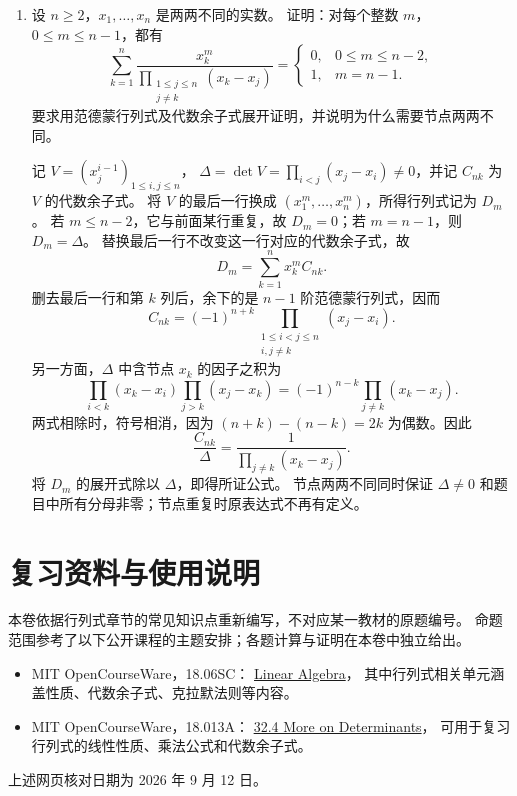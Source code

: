 \documentclass[UTF8,12pt,a4paper,fontset=fandol]{ctexart}
\begin{document}
\begin{enumerate}[label=\arabic*.,resume=detquestions]
\item\label{q:interpolation-sum}
设 $n\geq2$，$x_1,\ldots,x_n$ 是两两不同的实数。
证明：对每个整数 $m$，$0\leq m\leq n-1$，都有
\[
\sum_{k=1}^n
\frac{x_k^m}{\displaystyle\prod_{\substack{1\leq j\leq n\\j\ne k}}(x_k-x_j)}
=\begin{cases}0,&0\leq m\leq n-2,\\1,&m=n-1.\end{cases}
\]
要求用范德蒙行列式及代数余子式展开证明，并说明为什么需要节点两两不同。
\begin{solve}
记 $V=(x_j^{i-1})_{1\leq i,j\leq n}$，
$\Delta=\det V=\prod_{i<j}(x_j-x_i)\ne0$，并记 $C_{nk}$ 为 $V$ 的代数余子式。
将 $V$ 的最后一行换成 $(x_1^m,\ldots,x_n^m)$，所得行列式记为 $D_m$。
若 $m\leq n-2$，它与前面某行重复，故 $D_m=0$；若 $m=n-1$，则 $D_m=\Delta$。
替换最后一行不改变这一行对应的代数余子式，故
\[
D_m=\sum_{k=1}^n x_k^m C_{nk}.
\]
删去最后一行和第 $k$ 列后，余下的是 $n-1$ 阶范德蒙行列式，因而
\[
C_{nk}=(-1)^{n+k}
\prod_{\substack{1\leq i<j\leq n\\i,j\ne k}}(x_j-x_i).
\]
另一方面，$\Delta$ 中含节点 $x_k$ 的因子之积为
\[
\prod_{i<k}(x_k-x_i)\prod_{j>k}(x_j-x_k)
=(-1)^{n-k}\prod_{j\ne k}(x_k-x_j).
\]
两式相除时，符号相消，因为 $(n+k)-(n-k)=2k$ 为偶数。因此
\[
\frac{C_{nk}}{\Delta}=\frac1{\prod_{j\ne k}(x_k-x_j)}.
\]
将 $D_m$ 的展开式除以 $\Delta$，即得所证公式。
节点两两不同同时保证 $\Delta\ne0$ 和题目中所有分母非零；节点重复时原表达式不再有定义。
\end{solve}
\end{enumerate}

\section*{复习资料与使用说明}
本卷依据行列式章节的常见知识点重新编写，不对应某一教材的原题编号。
命题范围参考了以下公开课程的主题安排；各题计算与证明在本卷中独立给出。
\begin{itemize}
\item MIT OpenCourseWare，18.06SC：
\href{https://ocw.mit.edu/courses/18-06sc-linear-algebra-fall-2011/}{Linear Algebra}，
其中行列式相关单元涵盖性质、代数余子式、克拉默法则等内容。
\item MIT OpenCourseWare，18.013A：
\href{https://www.ocw.mit.edu/ans7870/18/18.013a/textbook/HTML/chapter32/section04.html}{32.4 More on Determinants}，
可用于复习行列式的线性性质、乘法公式和代数余子式。
\end{itemize}
上述网页核对日期为 2026 年 9 月 12 日。
\end{document}
